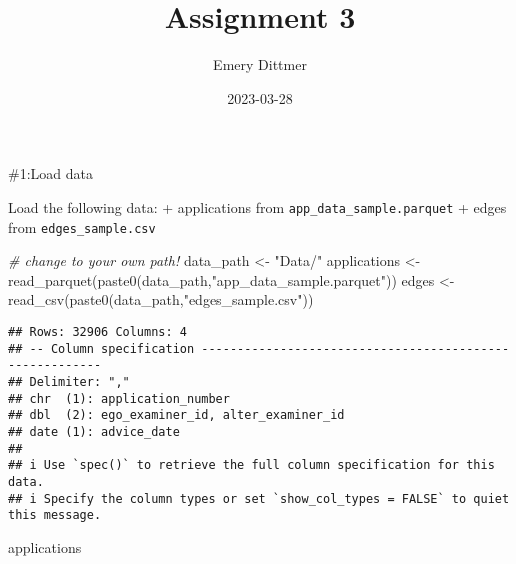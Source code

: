 \documentclass[
]{article}
\title{Assignment 3}
\author{Emery Dittmer}
\date{2023-03-28}
\newenvironment{Shaded}{\begin{snugshade}}{\end{snugshade}}
\newcommand{\CommentTok}[1]{\textcolor[rgb]{0.56,0.35,0.01}{\textit{#1}}}
\newcommand{\FunctionTok}[1]{\textcolor[rgb]{0.00,0.00,0.00}{#1}}
\newcommand{\NormalTok}[1]{#1}
\newcommand{\OtherTok}[1]{\textcolor[rgb]{0.56,0.35,0.01}{#1}}
\newcommand{\StringTok}[1]{\textcolor[rgb]{0.31,0.60,0.02}{#1}}
\begin{document}
\maketitle

\#1:Load data

Load the following data: + applications from
\texttt{app\_data\_sample.parquet} + edges from
\texttt{edges\_sample.csv}

\begin{Shaded}
\begin{Highlighting}[]
\CommentTok{\# change to your own path!}
\NormalTok{data\_path }\OtherTok{\textless{}{-}} \StringTok{"Data/"}
\NormalTok{applications }\OtherTok{\textless{}{-}} \FunctionTok{read\_parquet}\NormalTok{(}\FunctionTok{paste0}\NormalTok{(data\_path,}\StringTok{"app\_data\_sample.parquet"}\NormalTok{))}
\NormalTok{edges }\OtherTok{\textless{}{-}} \FunctionTok{read\_csv}\NormalTok{(}\FunctionTok{paste0}\NormalTok{(data\_path,}\StringTok{"edges\_sample.csv"}\NormalTok{))}
\end{Highlighting}
\end{Shaded}

\begin{verbatim}
## Rows: 32906 Columns: 4
## -- Column specification --------------------------------------------------------
## Delimiter: ","
## chr  (1): application_number
## dbl  (2): ego_examiner_id, alter_examiner_id
## date (1): advice_date
## 
## i Use `spec()` to retrieve the full column specification for this data.
## i Specify the column types or set `show_col_types = FALSE` to quiet this message.
\end{verbatim}

\begin{Shaded}
\begin{Highlighting}[]
\NormalTok{applications}
\end{Highlighting}
\end{Shaded}
\end{document}
